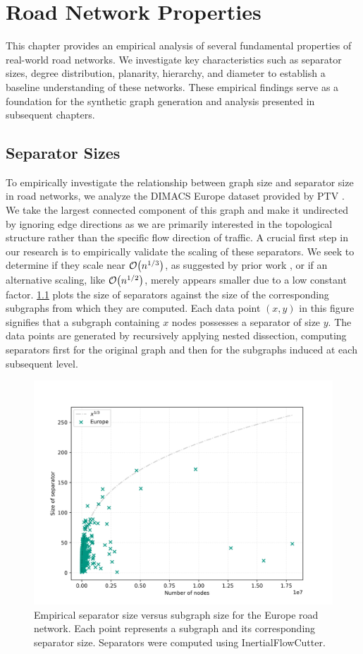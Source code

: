 \chapter{Road Network Properties}
\label{ch:properties}

This chapter provides an empirical analysis of several fundamental properties of real-world road networks.
We investigate key characteristics such as separator sizes, degree distribution, planarity, hierarchy, and diameter to establish a baseline understanding of these networks.
These empirical findings serve as a foundation for the synthetic graph generation and analysis presented in subsequent chapters.

\section{Separator Sizes}
\label{sec:empirical_analysis}

To empirically investigate the relationship between graph size and separator size in road networks, we analyze the DIMACS Europe dataset provided by PTV \cite{ptv_group_dimacs-europe_2009}.
We take the largest connected component of this graph and make it undirected by ignoring edge directions as we are primarily interested in the topological structure rather than the specific flow direction of traffic.
A crucial first step in our research is to empirically validate the scaling of these separators.
We seek to determine if they scale near \(\mathcal{O}\!\left(n^{1/3}\right)\), as suggested by prior work \cite{dibbelt_customizable_2016}, or if an alternative scaling, like \(\mathcal{O}\!\left(n^{1/2}\right)\), merely appears smaller due to a low constant factor.
\cref{fig:separator_size_vs_graph_size} plots the size of separators against the size of the corresponding subgraphs from which they are computed.
Each data point \( (x, y) \) in this figure signifies that a subgraph containing \( x \) nodes possesses a separator of size \( y \).
The data points are generated by recursively applying nested dissection, computing separators first for the original graph and then for the subgraphs induced at each subsequent level.

\begin{figure}[tbhp]
    \centering
    \includegraphics[width=0.7\linewidth]{graphics/Europe.png}
    \caption{Empirical separator size versus subgraph size for the Europe road network. Each point represents a subgraph and its corresponding separator size. Separators were computed using InertialFlowCutter.}
    \label{fig:separator_size_vs_graph_size}
\end{figure}

